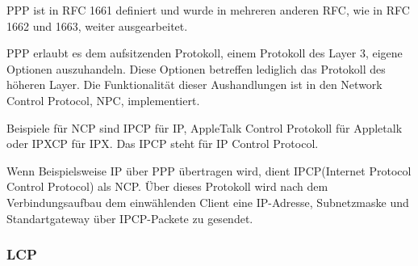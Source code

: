 \documentclass[12pt, a4paper, ngerman]{article}
\begin{document}
PPP ist in RFC 1661 definiert und wurde in mehreren anderen RFC, wie in RFC 1662 und 1663, weiter ausgearbeitet.

PPP erlaubt es dem aufsitzenden Protokoll, einem Protokoll des Layer 3, eigene Optionen auszuhandeln. Diese Optionen betreffen lediglich das Protokoll des höheren Layer. Die Funktionalität dieser Aushandlungen ist in den Network Control Protocol, NPC, implementiert.

Beispiele für NCP sind IPCP für IP, AppleTalk Control Protokoll für Appletalk oder IPXCP für IPX. Das IPCP steht für IP Control Protocol.

Wenn Beispielsweise IP über PPP übertragen wird, dient IPCP(Internet Protocol Control Protocol) als NCP. Über dieses Protokoll wird nach dem Verbindungsaufbau dem einwählenden Client eine IP-Adresse, Subnetzmaske und Standartgateway über IPCP-Packete zu gesendet. 

\subsubsection{LCP \label{lcp_operationen}}
\end{document}

